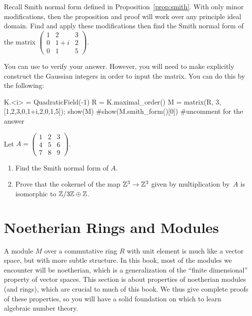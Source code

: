 \begin{exercise}
	Recall Smith normal form defined in Proposition~\ref{prop:smith}. With only minor modifications, then the proposition and proof will work over any principle ideal domain. Find and apply these modifications then find the Smith normal form of the matrix $\begin{pmatrix} 1 & 2 & 3 \\ 0 & 1+i & 2 \\ 0 & 1 & 5 \end{pmatrix}$.
	
	\begin{hint}
		You can use \sage{} to verify your answer. However, you will need to make explicitly construct the Gaussian integers in order to input the matrix. You can do this by the following:
		\begin{sagecode}
		\begin{sagecell}
K.<i> = QuadraticField(-1)
R = K.maximal_order()
M = matrix(R, 3, [1,2,3,0,1+i,2,0,1,5]); show(M)
#show(M.smith_form()[0]) #uncomment for the answer
		\end{sagecell}
		\end{sagecode}
	\end{hint}
\end{exercise}

\begin{exercise}
	Let $A=\left(
	        \begin{matrix}1&2&3\\4&5&6\\7&8&9
	        \end{matrix}\right)$. 
	\begin{enumerate}
	\item Find the Smith normal form of $A$.
	\item Prove that 
	the cokernel of the map $\mathbb{Z}^3\to \mathbb{Z}^3$ given by multiplication by~$A$ 
	is isomorphic to $\mathbb{Z}/3\mathbb{Z} \oplus \mathbb{Z}$.
	\end{enumerate}
\end{exercise}

\section{Noetherian Rings and Modules}\label{sec:noetherian}

A module $M$ over a commutative ring $R$ with unit element is much
like a vector space, but with more subtle structure.  In this book,
most of the modules we encounter will be noetherian, which is a
generalization of the ``finite dimensional'' property of vector
spaces.  This section is about properties of noetherian modules (and
rings), which are crucial to much of this book.  We thus
give complete proofs of these properties, so you will have a solid
foundation on which to learn algebraic number theory.

